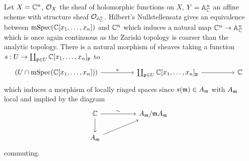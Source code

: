 \begin{example}
    Let $X=\mathbb{C}^{n}$, $\mathcal{O}_{X}$ the sheaf of holomorphic functions on $X$, $Y=\mathbb{A}^{n}_{\mathbb{C}}$ an affine scheme with structure sheaf $\mathcal{O}_{\mathbb{A}^{n}_{\mathbb{C}}}$. Hilbert's Nullstellensatz gives an equivalence between $\mathrm{mSpec}(\mathbb{C}[x_{1},\dots,x_{n}])$ and $\mathbb{C}^{n}$ which induces a natural map $\mathbb{C}^{n}\to\mathbb{A}^{n}_{\mathbb{C}}$ which is once again continuous as the Zariski topology is coarser than the analytic topology. There is a natural morphism of sheaves taking a function $s:U\to\coprod_{\mathfrak{p}\in U}\mathbb{C}[x_{1},\dots,x_{n}]_{\mathfrak{p}}$ to 
    $$%
    \begin{tikzcd}
        {(U\cap \mathrm{mSpec}(\CC[x_{1},\dots,x_{n}]))} && {\coprod_{\pfrak\in U}\CC[x_{1},\dots,x_{n}]_{\pfrak}} && \CC
        \arrow["s", from=1-1, to=1-3]
        \arrow[from=1-3, to=1-5]
    \end{tikzcd}$$
    which induces a morphism of locally ringed spaces since $s(\mathfrak{m})\in A_{\mathfrak{m}}$ with $A_{\mathfrak{m}}$ local and implied by the diagram 
    $$%
    \begin{tikzcd}
        \CC && {A_{\mfrak}/\mfrak A_{\mfrak}} \\
        {A_{\mfrak}}
        \arrow["\sim", from=1-1, to=1-3]
        \arrow[from=1-1, to=2-1]
        \arrow[from=2-1, to=1-3]
    \end{tikzcd}$$
    commuting. 
\end{example}